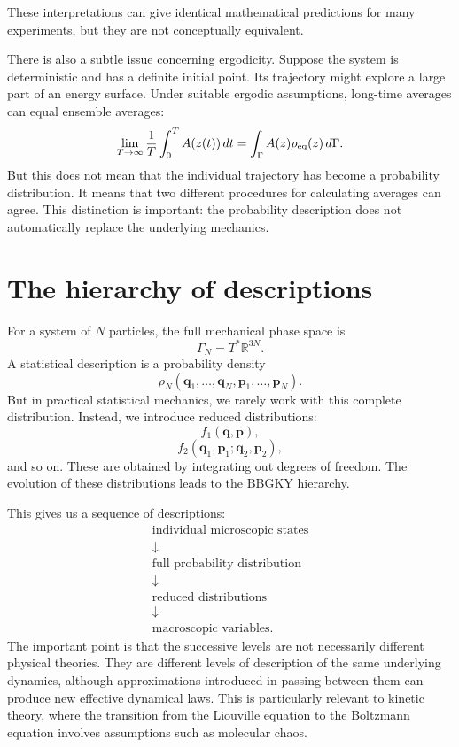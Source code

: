 These interpretations can give identical mathematical predictions for many
experiments, but they are not conceptually equivalent.

There is also a subtle issue concerning ergodicity.
Suppose the system is deterministic and has a definite initial point. Its
trajectory might explore a large part of an energy surface. Under suitable
ergodic assumptions, long-time averages can equal ensemble averages:
\[\lim_{T\to\infty}\frac1T\int_0^T A(z(t))\,dt=
\int_\Gamma A(z)\rho_{\rm eq}(z)\,d\Gamma.\]
But this does not mean that the individual trajectory has become a probability
distribution.
It means that two different procedures for calculating averages can agree.
This distinction is important: the probability description does not
automatically replace the underlying mechanics.

\section{The hierarchy of descriptions}
For a system of \(N\) particles, the full mechanical phase space is
\[\Gamma_N=T^*\mathbb R^{3N}.\]
A statistical description is a probability density
\[\rho_N(\mathbf q_1,\ldots,\mathbf q_N,\mathbf p_1,\ldots,\mathbf p_N).\]
But in practical statistical mechanics, we rarely work with this complete
distribution.
Instead, we introduce reduced distributions:
\[f_1(\mathbf q,\mathbf p),\]
\[f_2(\mathbf q_1,\mathbf p_1;\mathbf q_2,\mathbf p_2),\]
and so on.
These are obtained by integrating out degrees of freedom.
The evolution of these distributions leads to the BBGKY hierarchy.

This gives us a sequence of descriptions:
\begin{equation*}
    \begin{gathered}
\text{individual microscopic states}\\
\downarrow \\
\text{full probability distribution}\\
\downarrow \\
\text{reduced distributions}\\
\downarrow \\
\text{macroscopic variables}.
    \end{gathered}
\end{equation*}
The important point is that the successive levels are not necessarily different
physical theories. They are different levels of description of the same
underlying dynamics, although approximations introduced in passing between them
can produce new effective dynamical laws.
This is particularly relevant to kinetic theory, where the transition from the
Liouville equation to the Boltzmann equation involves assumptions such as
molecular chaos.

